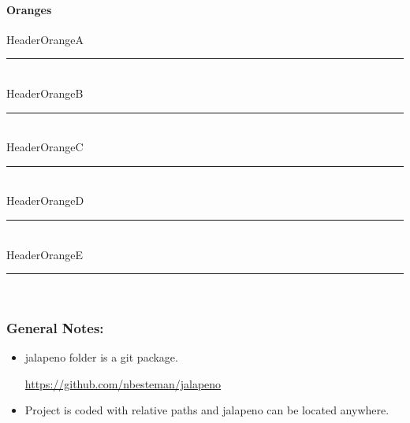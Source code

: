 \documentclass[class=book , crop=false]{standalone}
\begin{document}
\paragraph[Oranges]{Oranges\texorpdfstring{\\}{}}
\textcolor{HeaderOrangeA}{HeaderOrangeA}
\noindent\textcolor{HeaderOrangeA}{\rule{.5\textwidth}{.5mm}}\\
\textcolor{HeaderOrangeB}{HeaderOrangeB}
\noindent\textcolor{HeaderOrangeB}{\rule{.5\textwidth}{.5mm}}\\
\textcolor{HeaderOrangeC}{HeaderOrangeC}
\noindent\textcolor{HeaderOrangeC}{\rule{.5\textwidth}{.5mm}}\\
\textcolor{HeaderOrangeD}{HeaderOrangeD}
\noindent\textcolor{HeaderOrangeD}{\rule{.5\textwidth}{.5mm}}\\
\textcolor{HeaderOrangeE}{HeaderOrangeE}
\noindent\textcolor{HeaderOrangeE}{\rule{.5\textwidth}{.5mm}}\\
%

\clearpage
\subsubsection{General Notes:}
\begin{itemize}
\item jalapeno folder is a git package.

\href{https://github.com/nbesteman/jalapeno}{https://github.com/nbesteman/jalapeno}

\item Project is coded with relative paths and jalapeno can be located anywhere.

\end{itemize}
\end{document}

